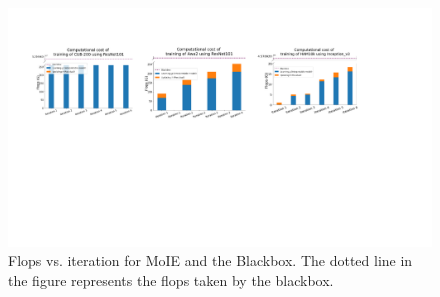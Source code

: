 \documentclass{article}
\theoremstyle{plain}
\theoremstyle{definition}
\theoremstyle{remark}
\begin{document}
\begin{figure}[h]
\centering
\includegraphics[width=1.0\textwidth]
{figures/Supp/Flops.pdf}
\caption{Flops vs. iteration for MoIE and the Blackbox. The dotted line in the figure represents the flops taken by the blackbox.}
\label{fig:flops}
\end{figure}


% 





\end{document}
